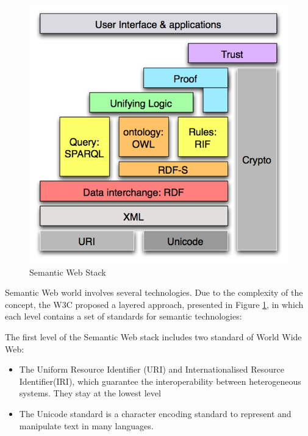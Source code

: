 \begin{figure}[tbh]
  \centering
	\includegraphics[width=0.75\linewidth]{images/semantic_web_stack}
	\caption{Semantic Web Stack} 
  	\label{fig:semantic-web-stack}
\end{figure}
 

Semantic Web world involves several technologies. Due to the complexity of the concept, the W3C proposed a layered approach, presented in Figure \ref{fig:semantic-web-stack}, in which each level contains a set of standards for semantic technologies:

The first level of the Semantic Web stack includes  two standard of World Wide Web:
\begin{itemize}
\item  The Uniform Resource Identifier (URI)  and Internationalised Resource Identifier(IRI), which guarantee the interoperability between heterogeneous systems. They stay at the lowest level
\item  The Unicode standard is a character encoding standard to represent and manipulate text in many languages.
\end{itemize}

